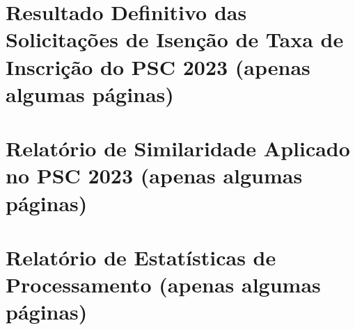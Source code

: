 \documentclass[
	12pt,			%
	openright,		%
	oneside,	
	a4paper,		%
	english,		%
	brazil			%
]{abntex2/abntex2}  %
\begin{document}
	\begin{anexosenv}
		
		\chapter{Resultado Definitivo das Solicitações de Isenção de Taxa de Inscrição do PSC 2023 (apenas algumas páginas)}
		
		
		\chapter{Relatório de Similaridade Aplicado no PSC 2023 (apenas algumas páginas)}
		
		
		\chapter{Relatório de Estatísticas de Processamento (apenas algumas páginas)}
		
		
	\end{anexosenv}
\end{document}
